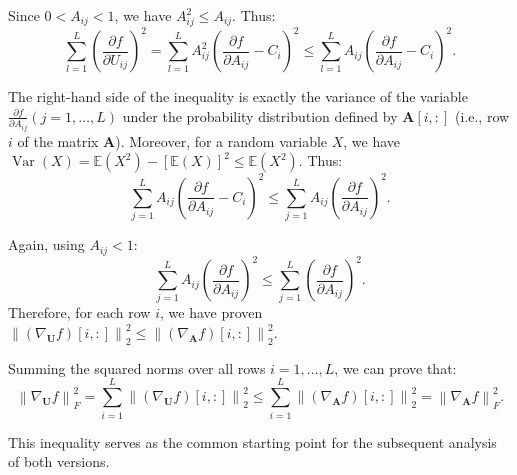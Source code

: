 \documentclass[lettersize,onecolumn]{IEEEtran}
\begin{document}
Since $0< A_{ij} < 1$, we have $A_{ij}^2 \leq A_{ij}$. Thus:
\begin{equation}
    \sum_{l=1}^{L} \left(\frac{\partial f}{\partial U_{i j}}\right)^{2} =\sum_{l=1}^{L} A_{ij}^{2} \left( \frac{\partial f}{\partial A_{ij}} - C_i\right)^{2} \leq \sum_{l=1}^{L} A_{ij} \left( \frac{\partial f}{\partial A_{ij}} - C_i\right)^{2}.
\end{equation}

The right-hand side of the inequality is exactly the variance of the variable $\frac{\partial f}{\partial A_{ij}}(j=1,\ldots, L)$ under the probability distribution defined by $\mathbf{A}[i,:]$ (i.e., row $i$ of the matrix $\mathbf{A}$). Moreover, for a random variable $X$, we have $\operatorname{Var}(X)= \mathbb{E}(X^2)-[\mathbb{E}(X)]^2 \leq \mathbb{E}(X^2)$. Thus: 
\begin{equation}
    \sum_{j=1}^{L} A_{i j}\left(\frac{\partial f}{\partial A_{i j}}-C_{i}\right)^{2} \leq \sum_{j=1}^{L} A_{i j}\left(\frac{\partial f}{\partial A_{i j}}\right)^{2}.
\end{equation}

Again, using $A_{ij} < 1$:
\begin{equation}
    \sum_{j=1}^{L} A_{i j}\left(\frac{\partial f}{\partial A_{i j}}\right)^{2} \leq \sum_{j=1}^{L} \left(\frac{\partial f}{\partial A_{i j}}\right)^{2}.
\end{equation}
Therefore, for each row $i$, we have proven $\left\|\left(\nabla_{\mathbf{U}} f\right)[i,:]\right\|_{2}^{2} \leq\left\|\left(\nabla_{\mathbf{A}} f\right)[i,:]\right\|_{2}^{2}$.

Summing the squared norms over all rows $i=1, \ldots, L$, we can prove that:
\begin{equation}
    \left\|\nabla_{\mathbf{U}} f\right\|_{F}^{2}=\sum_{i=1}^{L}\left\|\left(\nabla_{\mathbf{U}} f\right)[i,:]\right\|_{2}^{2} \leq \sum_{i=1}^{L}\left\|\left(\nabla_{\mathbf{A}} f\right)[i,:]\right\|_{2}^{2}=\left\|\nabla_{\mathbf{A}} f\right\|_{F}^{2}.
    \label{eq: grad U f <= grad A f, Frobenius norm}
\end{equation}

This inequality serves as the common starting point for the subsequent analysis of both versions.
\end{document}
